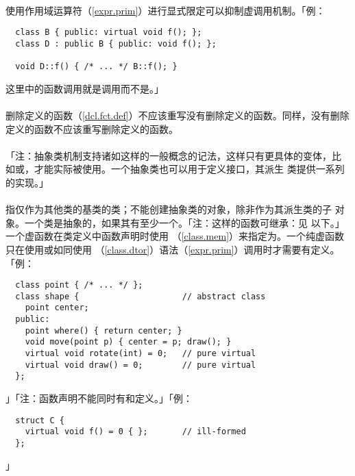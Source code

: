 \paragraph{}
使用作用域运算符（\ref{expr.prim}）进行显式限定可以抑制虚调用机制。「例：
\begin{lstlisting}
  class B { public: virtual void f(); };
  class D : public B { public: void f(); };

  void D::f() { /* ... */ B::f(); }
\end{lstlisting}
这里中的函数调用就是调用而不是。」

\paragraph{}
删除定义的函数（\ref{dcl.fct.def}）不应该重写没有删除定义的函数。同样，没有删除
定义的函数不应该重写删除定义的函数。

\paragraph{}
「注：抽象类机制支持诸如这样的一般概念的记法，这样只有更具体的变体，比
如或，才能实际被使用。一个抽象类也可以用于定义接口，其派生
类提供一系列的实现。」

\paragraph{}
指仅作为其他类的基类的类；不能创建抽象类的对象，除非作为其派生类的子
对象。一个类是抽象的，如果其有至少一个。「注：这样的函数可继承：见
以下。」一个虚函数在类定义中函数声明时使用
（\ref{class.mem}）来指定为。一个纯虚函数只在使用或如同使用
（\ref{class.dtor}）语法（\ref{expr.prim}）调用时才需要有定义。
「例：
\begin{lstlisting}
  class point { /* ... */ };
  class shape {                     // abstract class
    point center;
  public:
    point where() { return center; }
    void move(point p) { center = p; draw(); }
    virtual void rotate(int) = 0;   // pure virtual
    virtual void draw() = 0;        // pure virtual
  };
\end{lstlisting}」「注：函数声明不能同时有和定义。」「例：
\begin{lstlisting}
  struct C {
    virtual void f() = 0 { };       // ill-formed
  };
\end{lstlisting}」

